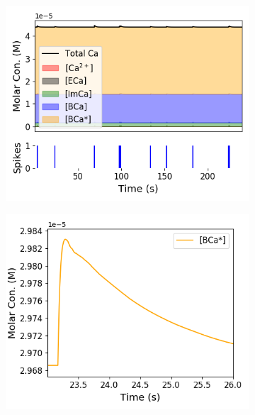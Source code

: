 \begin{figure}[p]
  \begin{subfigure}{0.5\textwidth}
    \includegraphics[width=\textwidth]{figures/calcium_chapter/concentration_dynamics_18.png}
    \caption{}
    \label{fig:concentration_dynamics_a}
  \end{subfigure}
  \begin{subfigure}{0.5\textwidth}
    \includegraphics[width=\textwidth]{figures/calcium_chapter/concentration_dynamics_18_zoomed_BCa_star.png}
    \caption{}
  \end{subfigure}
  \begin{subfigure}{0.5\textwidth}

\end{subfigure}
\end{figure}
